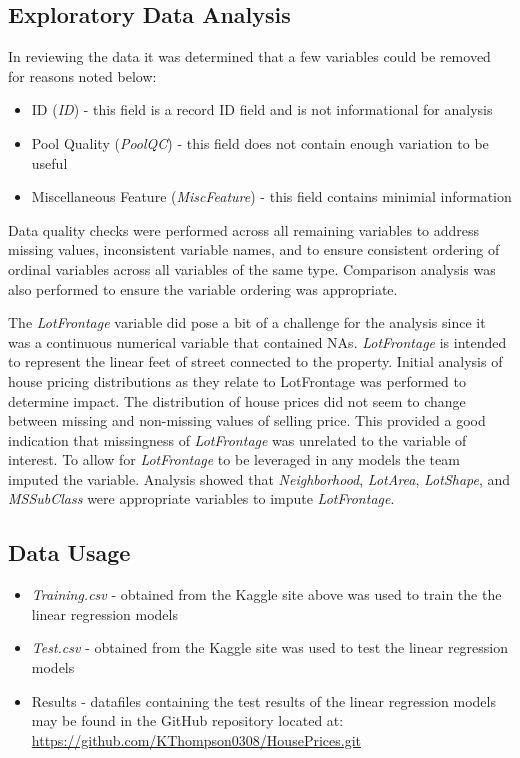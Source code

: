 \documentclass[american,]{article}
\providecommand{\tightlist}{%
  \setlength{\itemsep}{0pt}\setlength{\parskip}{0pt}}
\begin{document}
\subsection{Exploratory Data Analysis}\label{exploratory-data-analysis}

In reviewing the data it was determined that a few variables could be
removed for reasons noted below:

\begin{itemize}
\tightlist
\item
  ID (\emph{ID}) - this field is a record ID field and is not
  informational for analysis
\item
  Pool Quality (\emph{PoolQC}) - this field does not contain enough
  variation to be useful
\item
  Miscellaneous Feature (\emph{MiscFeature}) - this field contains
  minimial information
\end{itemize}

Data quality checks were performed across all remaining variables to
address missing values, inconsistent variable names, and to ensure
consistent ordering of ordinal variables across all variables of the
same type. Comparison analysis was also performed to ensure the variable
ordering was appropriate.

The \emph{LotFrontage} variable did pose a bit of a challenge for the
analysis since it was a continuous numerical variable that contained
NAs. \emph{LotFrontage} is intended to represent the linear feet of
street connected to the property. Initial analysis of house pricing
distributions as they relate to LotFrontage was performed to determine
impact. The distribution of house prices did not seem to change between
missing and non-missing values of selling price. This provided a good
indication that missingness of \emph{LotFrontage} was unrelated to the
variable of interest. To allow for \emph{LotFrontage} to be leveraged in
any models the team imputed the variable. Analysis showed that
\emph{Neighborhood}, \emph{LotArea}, \emph{LotShape}, and
\emph{MSSubClass} were appropriate variables to impute
\emph{LotFrontage}.

\subsection{Data Usage}\label{data-usage}

\begin{itemize}
\item
  \emph{Training.csv} - obtained from the Kaggle site above was used to
  train the the linear regression models
\item
  \emph{Test.csv} - obtained from the Kaggle site was used to test the
  linear regression models
\item
  Results - datafiles containing the test results of the linear
  regression models may be found in the GitHub repository located at:
  \url{https://github.com/KThompson0308/HousePrices.git}
\end{itemize}
\end{document}

